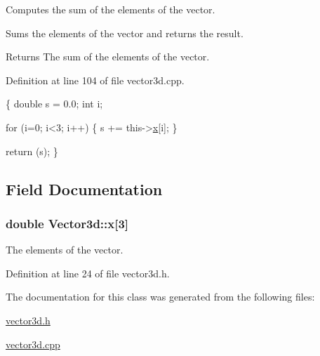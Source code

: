 Computes the sum of the elements of the vector. 

Sums the elements of the vector and returns the result. \begin{DoxyReturn}{Returns}
The sum of the elements of the vector. 
\end{DoxyReturn}


Definition at line 104 of file vector3d.\-cpp.


\begin{DoxyCode}
\{
  \textcolor{keywordtype}{double} s = 0.0;
  \textcolor{keywordtype}{int} i;
  
  \textcolor{keywordflow}{for} (i=0; i<3; i++)
    \{
      s += this->\hyperlink{classVector3d_ae5e82a2be7cc2e195e56875a5befe509}{x}[i];
    \}
  
  \textcolor{keywordflow}{return} (s);
\}
\end{DoxyCode}


\subsection{Field Documentation}
\hypertarget{classVector3d_ae5e82a2be7cc2e195e56875a5befe509}{
\subsubsection[{x}]{\setlength{\rightskip}{0pt plus 5cm}double Vector3d\-::x\mbox{[}3\mbox{]}\hspace{0.3cm}{\ttfamily [protected]}}}\label{df/dd0/classVector3d_ae5e82a2be7cc2e195e56875a5befe509}


The elements of the vector. 



Definition at line 24 of file vector3d.\-h.



The documentation for this class was generated from the following files\-:\begin{DoxyCompactItemize}
\item 
\hyperlink{vector3d_8h}{vector3d.\-h}\item 
\hyperlink{vector3d_8cpp}{vector3d.\-cpp}\end{DoxyCompactItemize}

